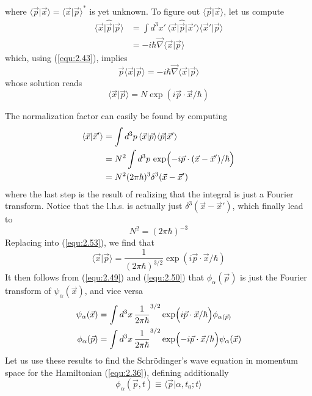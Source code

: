 where $\langle \vec{p}\vert \vec{x}\rangle  = \langle \vec{x}\vert \vec{p}\rangle ^*$ is yet
unknown. To figure out $\langle \vec{p}\vert \vec{x}\rangle $, let us compute
\begin{align}
  \langle \vec{x}\vert \hat{\vec{p}}\vert \vec{p}\rangle  &= \int d^3 x' \,
  \langle \vec{x}\vert \hat{\vec{p}}\vert \vec{x}'\rangle 
  \langle \vec{x}'\vert \vec{p}\rangle \nonumber\\
  &= -i\hbar \vec{\nabla} \langle \vec{x}\vert \vec{p}\rangle  \label{equ:2.51}
\end{align}
which, using (\ref{equ:2.43}), implies
\begin{equation}
  \vec{p} \langle \vec{x}\vert \vec{p}\rangle  = -i \hbar
  \vec{\nabla}\langle \vec{x}\vert \vec{p}\rangle 
  \label{equ:2.52}
\end{equation}
whose solution reads
\begin{equation}
  \langle \vec{x}\vert \vec{p}\rangle  = N \exp(i \vec{p} \cdot \vec{x}/\hbar)
  \label{equ:2.53}
\end{equation}

The normalization factor can easily be found by computing
\begin{align}
  \langle \vec{x}\vert \vec{x}'\rangle  &= \int d^3 p \, \langle \vec{x}\vert \vec{p}\rangle 
  \langle \vec{p}\vert \vec{x}'\rangle \nonumber\\
  &= N^2 \int d^3 p\, \exp\Bigl(-i \vec{p}\cdot
  (\vec{x}-\vec{x}')/\hbar\Bigr) \nonumber\\
  &=
  N^2 (2\pi \hbar)^3 \delta^3(\vec{x}-\vec{x}')
  \label{equ:2.54}
\end{align}
where the last step is the result of realizing that the
integral is just a Fourier transform. Notice that the l.h.s.
is actually just $\delta^3(\vec{x}-\vec{x}')$, which finally
lead to
\begin{equation}
  N^2 = (2\pi\hbar)^{-3}
  \label{equ:2.55}
\end{equation}
Replacing into (\ref{equ:2.53}), we find that
\begin{equation}
  \langle \vec{x}\vert \vec{p}\rangle  = \frac{1}{(2\pi\hbar)^{3/2}} \exp(i
  \vec{p}\cdot \vec{x}/\hbar)
  \label{equ:2.56}
\end{equation}
It then follows from (\ref{equ:2.49}) and (\ref{equ:2.50}) that
$\phi_{\alpha}(\vec{p})$ is just the Fourier transform of
$\psi_{\alpha}(\vec{x})$, and vice versa
\begin{align}
  \psi_{\alpha}(\vec{x}) &= \int d^3x \,
  \frac{1}{2\pi\hbar}^{3/2}
  \exp\Bigl(i\vec{p}\cdot\vec{x}/\hbar\Bigr)
  \phi_{\alpha(\vec{p})}\\
  \phi_{\alpha}(\vec{p}) &= \int d^3x \,
  \frac{1}{2\pi\hbar}^{3/2}
  \exp\Bigl(-i\vec{p}\cdot\vec{x}/\hbar\Bigr)
  \psi_{\alpha}(\vec{x})
\end{align}
Let us use these results to find the Schrödinger's wave
equation in momentum space for the Hamiltonian
(\ref{equ:2.36}), defining additionally
\begin{equation}
  \phi_{\alpha}(\vec{p},t) \equiv \langle \vec{p}\vert \alpha,t_0;t\rangle 
  \label{equ:2.58}
\end{equation}

